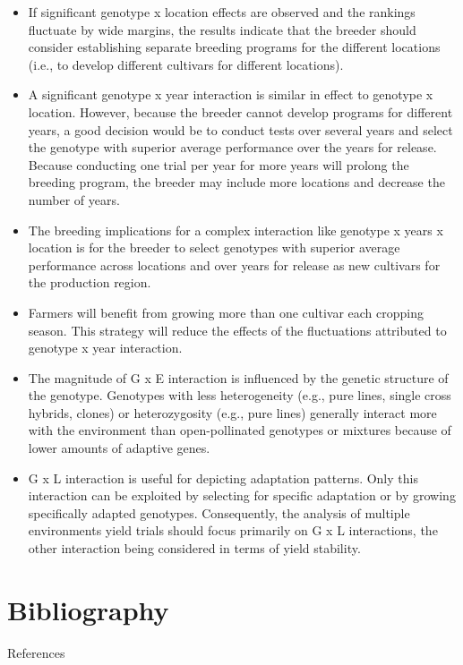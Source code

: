\documentclass[11pt,dvipsnames,ignorenonframetext,aspectratio=169]{beamer}
\providecommand{\tightlist}{%
  \setlength{\itemsep}{0pt}\setlength{\parskip}{0pt}}
\begin{document}
\begin{frame}{}
\protect\hypertarget{section-8}{}
\small

\begin{itemize}
\tightlist
\item
  If significant genotype x location effects are observed and the
  rankings fluctuate by wide margins, the results indicate that the
  breeder should consider establishing separate breeding programs for
  the different locations (i.e., to develop different cultivars for
  different locations).
\item
  A significant genotype x year interaction is similar in effect to
  genotype x location. However, because the breeder cannot develop
  programs for different years, a good decision would be to conduct
  tests over several years and select the genotype with superior average
  performance over the years for release. Because conducting one trial
  per year for more years will prolong the breeding program, the breeder
  may include more locations and decrease the number of years.
\item
  The breeding implications for a complex interaction like genotype x
  years x location is for the breeder to select genotypes with superior
  average performance across locations and over years for release as new
  cultivars for the production region.
\end{itemize}
\end{frame}

\begin{frame}{}
\protect\hypertarget{section-9}{}
\small

\begin{itemize}
\tightlist
\item
  Farmers will benefit from growing more than one cultivar each cropping
  season. This strategy will reduce the effects of the fluctuations
  attributed to genotype x year interaction.
\item
  The magnitude of G x E interaction is influenced by the genetic
  structure of the genotype. Genotypes with less heterogeneity (e.g.,
  pure lines, single cross hybrids, clones) or heterozygosity (e.g.,
  pure lines) generally interact more with the environment than
  open-pollinated genotypes or mixtures because of lower amounts of
  adaptive genes.
\item
  G x L interaction is useful for depicting adaptation patterns. Only
  this interaction can be exploited by selecting for specific adaptation
  or by growing specifically adapted genotypes. Consequently, the
  analysis of multiple environments yield trials should focus primarily
  on G x L interactions, the other interaction being considered in terms
  of yield stability.
\end{itemize}
\end{frame}

\hypertarget{bibliography}{%
\section{Bibliography}\label{bibliography}}

\begin{frame}{References}
\protect\hypertarget{references}{}
\end{frame}
\end{document}
